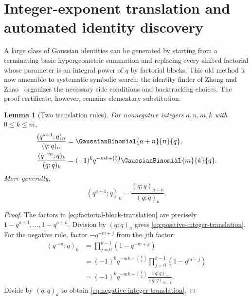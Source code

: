 \documentclass[11pt,a4paper,oneside,openany]{book}
\newtheorem{lemma}[lemma]{Lemma}
\theoremstyle{definition}
\theoremstyle{remark}
\begin{document}
\section{Integer-exponent translation and automated identity discovery}\label{sec:identity-discovery}

A large class of Gaussian identities can be generated by starting from a terminating basic hypergeometric summation and replacing every shifted factorial whose parameter is an integral power of $q$ by factorial blocks.  This old method is now amenable to systematic symbolic search; the identity finder of Zhong and Zhao~\cite{ZhongZhao2026} organizes the necessary side conditions and backtracking choices.  The proof certificate, however, remains elementary substitution.

\begin{lemma}[Two translation rules]\label{lem:integer-qpochhammer-translation}
For nonnegative integers $a,n,m,k$ with $0\le k\le m$,
\begin{align}
 \frac{(q^{a+1};q)_n}{(q;q)_n}
 &=\GaussianBinomial{a+n}{n}{q},
 \label{eq:positive-integer-translation}\\
 \frac{(q^{-m};q)_k}{(q;q)_k}
 &=(-1)^kq^{-mk+\binom k2}\GaussianBinomial{m}{k}{q}.
 \label{eq:negative-integer-translation}
\end{align}
More generally,
\begin{equation}\label{eq:factorial-block-translation}
 (q^{a+1};q)_n=\frac{(q;q)_{a+n}}{(q;q)_a}.
\end{equation}
\end{lemma}

\begin{proof}
The factors in \eqref{eq:factorial-block-translation} are precisely
$1-q^{a+1},\ldots,1-q^{a+n}$.  Division by $(q;q)_n$ gives
\eqref{eq:positive-integer-translation}.  For the negative rule, factor
$-q^{-m+j}$ from the $j$th factor:
\begin{align*}
 (q^{-m};q)_k
 &=\prod_{j=0}^{k-1}(1-q^{-m+j})\\
 &=(-1)^kq^{-mk+\binom k2}
   \prod_{j=0}^{k-1}(1-q^{m-j})\\
 &=(-1)^kq^{-mk+\binom k2}
   \frac{(q;q)_m}{(q;q)_{m-k}}.
\end{align*}
Divide by $(q;q)_k$ to obtain \eqref{eq:negative-integer-translation}.
\end{proof}
\end{document}
